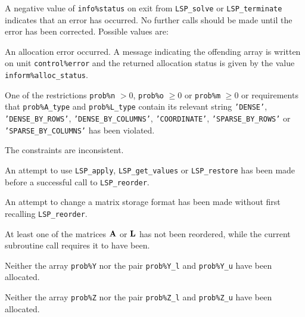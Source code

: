 \documentclass{galahad}
\newcommand{\packagename}{LSP}
\begin{document}
\galerrors
A negative value of {\tt info\%status} on exit from 
{\tt \packagename\_solve}
or 
{\tt \packagename\_terminate}
indicates that an error has occurred. No further calls should be made
until the error has been corrected. Possible values are:

\begin{description}

 An allocation error occurred. 
A message indicating the offending 
 array is written on unit {\tt control\%error} and the returned allocation 
 status is given by the value {\tt inform\%alloc\_status}.

 One of the restrictions 
{\tt prob\%n} $> 0$, {\tt prob\%o} $\geq  0$ or {\tt prob\%m} $\geq  0$
    or requirements that {\tt prob\%A\_type} 
    and {\tt prob\%L\_type} contain its relevant string
    {\tt 'DENSE'}, {\tt 'DENSE\_BY\_ROWS'}, {\tt 'DENSE\_BY\_COLUMNS'}, 
   {\tt 'COORDINATE'}, {\tt 'SPARSE\_BY\_ROWS'} or {\tt 'SPARSE\_BY\_COLUMNS'} 
    has been violated.


 The constraints are inconsistent.

 An attempt to use 
{\tt \packagename\_apply}, {\tt \packagename\_get\_values} 
or {\tt \packagename\_restore} 
has been made before a successful call to {\tt \packagename\_reorder}. 
 
 An attempt to change a matrix storage format has been made 
without first recalling {\tt \packagename\_reorder}. 
 
 At least one of the matrices ${\mathbf{A}}$ or ${\mathbf{L}}$ has not been reordered,
while the current subroutine call requires it to have been. 

 Neither the array {\tt prob\%Y} nor the pair {\tt prob\%Y\_l} and
{\tt prob\%Y\_u} have been allocated.

 Neither the array {\tt prob\%Z} nor the pair {\tt prob\%Z\_l} and
{\tt prob\%Z\_u} have been allocated.

\end{description}

\end{document}
